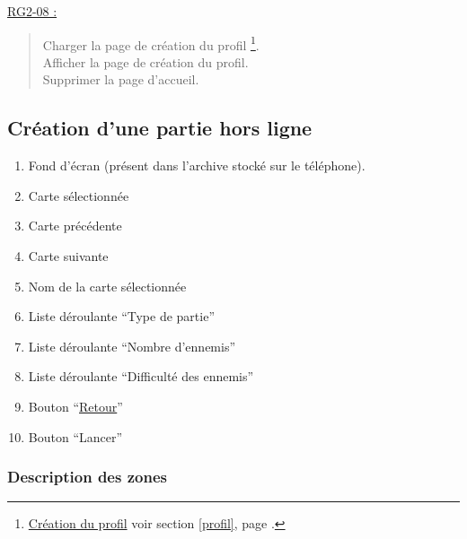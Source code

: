 \documentclass{report}
\begin{document}
		\underline{RG2-08 :}
			\begin{quote}
				Charger la page de création du profil%
					\footnote{
						\hyperlink{profil}{Création du profil}
						\og voir section \ref{profil}, page \pageref{profil}.\fg
					}.\\
				Afficher la page de création du profil\footnotemark[8].\\
				Supprimer la page d'accueil\footnotemark[2].\\			
			\end{quote}

	
\newpage

	\subsection{Création d'une partie hors ligne}
	
		\hypertarget{Creer partie solo}{}
		\label{Creer partie solo}

		\begin{center}
					
		\end{center}
		
		\begin{enumerate}
		  \item Fond d'écran (présent dans l'archive stocké sur le téléphone).
		  \item Carte sélectionnée
		  \item Carte précédente
		  \item Carte suivante
		  \item Nom de la carte sélectionnée
		  \item Liste déroulante ``Type de partie''
		  \item Liste déroulante ``Nombre d'ennemis''
		  \item Liste déroulante ``Difficulté des ennemis''
		  \item Bouton ``\hyperlink{Page d'accueil}{Retour}''
		  \item Bouton ``Lancer'' 
		\end{enumerate}
		
		\subsubsection{Description des zones}
		
\end{document}

